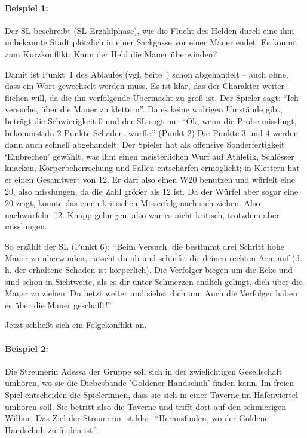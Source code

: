 \begin{beispiel}
\paragraph{Beispiel 1:} Der SL beschreibt (SL-Erzählphase), wie die Flucht des Helden durch eine ihm unbekannte Stadt plötzlich in einer Sackgasse vor einer Mauer endet. Es kommt zum Kurzkonflikt: Kann der Held die Mauer überwinden?

Damit ist Punkt~1 des Ablaufes (vgl. Seite~\pageref{KurzkonfliktAblauf}) schon abgehandelt -- auch ohne, dass ein Wort gewechselt werden muss. Es ist klar, das der Charakter weiter fliehen will, da die ihn verfolgende Übermacht zu groß ist. Der Spieler sagt: ``Ich versuche, über die Mauer zu klettern''. Da es keine widrigen Umstände gibt, beträgt die Schwierigkeit 0 und der SL sagt nur ``Ok, wenn die Probe misslingt, bekommst du 2 Punkte Schaden. würfle.'' (Punkt 2) Die Punkte 3 und 4 werden dann auch schnell abgehandelt: Der Spieler hat als offensive Sonderfertigkeit `Einbrechen' gewählt, was ihm einen meisterlichen Wurf auf Athletik, Schlösser knacken, Körperbeherrschung und Fallen entschärfen ermöglicht; in Klettern hat er einen Gesamtwert von 12. Er darf also einen W20 benutzen und würfelt eine 20, also misslungen, da die Zahl größer als 12 ist. Da der Würfel aber sogar eine 20 zeigt, könnte das einen kritischen Misserfolg nach sich ziehen. Also nachwürfeln: 12. Knapp gelungen, also war es nicht kritisch, trotzdem aber misslungen.

So erzählt der SL (Punkt 6): ``Beim Versuch, die bestimmt drei Schritt hohe Mauer zu überwinden, rutscht du ab und schürfst dir deinen rechten Arm auf (d.\,h. der erhaltene Schaden ist körperlich). Die Verfolger biegen um die Ecke und sind schon in Sichtweite, als es dir unter Schmerzen endlich gelingt, dich über die Mauer zu ziehen. Du hetzt weiter und siehst dich um: Auch die Verfolger haben es über die Mauer geschafft!''

Jetzt schließt sich ein Folgekonflikt an.

\paragraph{Beispiel 2:} Die Streunerin Adessa der Gruppe soll sich in der zwielichtigen Gesellschaft umhören, wo sie die Diebesbande 'Goldener Handschuh' finden kann. Im freien Spiel entscheiden die Spielerinnen, dass sie sich in einer Taverne im Hafenviertel umhören soll. Sie betritt also die Taverne und trifft dort auf den schmierigen Wilbur. Das Ziel der Streunerin ist klar: ``Herausfinden, wo der Goldene Handschuh zu finden ist''.


\end{beispiel}
